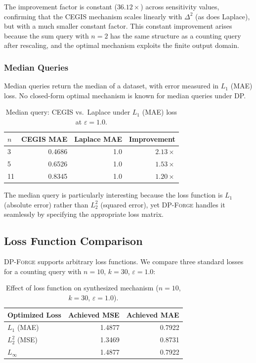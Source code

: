\documentclass[11pt,a4paper]{article}
\newcommand{\dpforge}{\textsc{DP-Forge}}
\newcommand{\eps}{\varepsilon}
\begin{document}
The improvement factor is constant ($36.12\times$) across sensitivity values,
confirming that the CEGIS mechanism scales linearly with $\Delta^2$ (as does
Laplace), but with a much smaller constant factor.  This constant improvement
arises because the sum query with $n=2$ has the same structure as a counting
query after rescaling, and the optimal mechanism exploits the finite output
domain.

\subsubsection{Median Queries}

Median queries return the median of a dataset, with error measured in $L_1$
(MAE) loss.  No closed-form optimal mechanism is known for median queries under DP.

\begin{table}[t]
\centering
\caption{Median query: CEGIS vs.\ Laplace under $L_1$ (MAE) loss at $\eps = 1.0$.}
\label{tab:median}
\begin{tabular}{@{}lrrr@{}}
\toprule
$n$ & CEGIS MAE & Laplace MAE & Improvement \\
\midrule
3   & 0.4686 & 1.0 & $2.13\times$ \\
5   & 0.6526 & 1.0 & $1.53\times$ \\
11  & 0.8345 & 1.0 & $1.20\times$ \\
\bottomrule
\end{tabular}
\end{table}

The median query is particularly interesting because the loss function is
$L_1$ (absolute error) rather than $L_2^2$ (squared error), yet \dpforge{}
handles it seamlessly by specifying the appropriate loss matrix.

\subsection{Loss Function Comparison}
\label{subsec:lossfunc}

\dpforge{} supports arbitrary loss functions.  We compare three standard losses
for a counting query with $n = 10$, $k = 30$, $\eps = 1.0$:

\begin{table}[t]
\centering
\caption{Effect of loss function on synthesized mechanism ($n=10$, $k=30$, $\eps=1.0$).}
\label{tab:lossfunc}
\begin{tabular}{@{}lrr@{}}
\toprule
Optimized Loss & Achieved MSE & Achieved MAE \\
\midrule
$L_1$ (MAE) & 1.4877 & 0.7922 \\
$L_2^2$ (MSE) & 1.3469 & 0.8731 \\
$L_\infty$ & 1.4877 & 0.7922 \\
\bottomrule
\end{tabular}
\end{table}
\end{document}
